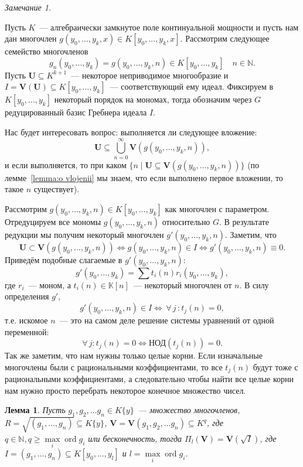 \documentclass[16pt]{article}
\DeclareMathOperator{\ord}{ord}
\theoremstyle{plain}
\newtheorem{lemma}[theorem]{Лемма}
\theoremstyle{definition}
\theoremstyle{remark}
\newtheorem{remark}[theorem]{Замечание}
\begin{document}
\begin{remark}\label{remark:o vlojenii}

Пусть $K$~--- алгебраически замкнутое поле континуальной
мощности и пусть нам дан многочлен $ g(y_0,\ldots,y_k,x)\in
K[y_0,\ldots,y_k,x]$. Рассмотрим следующее семейство многочленов
$$
g_n(y_0,\ldots,y_k) = g(y_0,\ldots,y_k,n) \in K[y_0,\ldots,y_k]\quad
n\in \mathbb N.
$$
Пусть $\mathbf{U}\subseteq K^{k+1}$~--- некоторое неприводимое многообразие и
$I=\mathbf{V}(\mathbf{U})\subseteq K[y_0,\ldots,y_k]$~---
соответствующий ему идеал. Фиксируем в $K[y_0,\ldots,y_k]$ некоторый
порядок на мономах, тогда обозначим через $G$ редуцированный базис
Гребнера идеала $I$.

Нас будет интересовать вопрос: выполняется ли следующее вложение:
$$
\mathbf{U}\subseteq \bigcup_{n=0}^{\infty}\mathbf{V}(g(y_0,\ldots,y_k,n)),
$$
и если выполняется, то при каком $\{n\mid\mathbf{U}\subseteq \mathbf{V}(g(y_0,\ldots,y_k,n))\}$ (по лемме~\ref{lemma:o vlojenii} мы знаем, что если выполнено первое вложении, то такое $n$ существует).

Рассмотрим $g(y_0,\ldots,y_k,n)\in K[y_0,\ldots,y_k]$ как многочлен с параметром. Отредуцируем все мономы $g(y_0,\ldots,y_k,n)$ относительно $G$. В результате редукции мы получим некоторый многочлен $g'(y_0,\ldots,y_k,n)$. Заметим, что
$$
\mathbf{U} \subset \mathbf{V}(g(y_0,\ldots, y_k,n))
\Leftrightarrow g(y_0,\ldots, y_k,n)\in I\Leftrightarrow
g'(y_0,\ldots, y_k,n)\equiv0.
$$
Приведём подобные слагаемые в $g'(y_0,\ldots, y_k,n)$:
$$
g'(y_0,\ldots, y_k)=\sum\limits t_i(n)r_i(y_0,\ldots, y_k),
$$
где $r_i$~--- моном, а $t_i(n)\in\mathbb{K}[n]$~--- некоторый многочлен от $n$.
В силу определения $g'$,
$$
g'(y_0,\ldots, y_k,n)\in I\Leftrightarrow\, \forall\, j\,: t_j(n)=0,
$$
т.е. искомое $n$~--- это на самом деле решение системы уравнений от
одной переменной:
$$
\forall\, j:t_j(n)=0\Leftrightarrow \text{НОД}(t_j(n))=0.
$$
Так же заметим, что нам нужны только целые корни. Если изначальные
многочлены были с рациональными коэффициентами, то все $t_j(n)$
будут тоже с рациональными коэффициентами, а следовательно чтобы
найти все целые корни нам нужно просто перебрать некоторое конечное
множество чисел.
\end{remark}


\begin{lemma} \label{lemma:o proekcii}
Пусть $g_1,g_2,\ldots g_n\in K\{y\}$~--- множество многочленов, $R=\sqrt{(g_1,\ldots,g_n)}\subseteq K\{y\}$, $\mathbf{V}=\mathbf{V}(g_1,g_2,\ldots g_n)\subseteq K^{q}$, где $q\in \mathbb{N},q\geqslant \max\limits_i\ord g_i$ или бесконечность, тогда $\Pi_l(\mathbf{V})=\mathbf{V}(\sqrt{I})$, где $I =(g_1,\ldots,g_n)\subseteq K[y_0,\ldots,y_l]$ и $l=\max\limits_i\ord g_i$.

\end{lemma}
\end{document}
